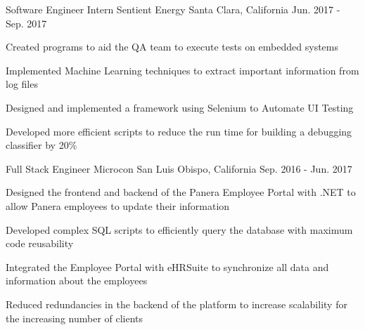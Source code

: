 


\begin{cventries}


\cventry
{Software Engineer Intern} %
{Sentient Energy} %
{Santa Clara, California} %
{Jun. 2017 - Sep. 2017} %
{ %
\begin{cvitems}
\item {Created programs to aid the QA team to execute tests on embedded systems}
\item {Implemented Machine Learning techniques to extract important information from log files}
\item {Designed and implemented a framework using Selenium to Automate UI Testing}
\item {Developed more efficient scripts to reduce the run time for building a debugging classifier by 20\%}
\end{cvitems}
}


\cventry
{Full Stack Engineer} %
{Microcon} %
{San Luis Obispo, California} %
{Sep. 2016 - Jun. 2017} %
{ %
\begin{cvitems}
\item {Designed the frontend and backend of the Panera Employee Portal with .NET to allow Panera employees to update their information}
\item {Developed complex SQL scripts to efficiently query the database with maximum code reusability}
\item {Integrated the Employee Portal with eHRSuite to synchronize all data and information about the employees}
\item {Reduced redundancies in the backend of the platform to increase scalability for the increasing number of clients}
\end{cvitems}
}


\end{cventries}
